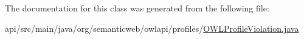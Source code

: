 The documentation for this class was generated from the following file\-:\begin{DoxyCompactItemize}
\item 
api/src/main/java/org/semanticweb/owlapi/profiles/\hyperlink{_o_w_l_profile_violation_8java}{O\-W\-L\-Profile\-Violation.\-java}\end{DoxyCompactItemize}
